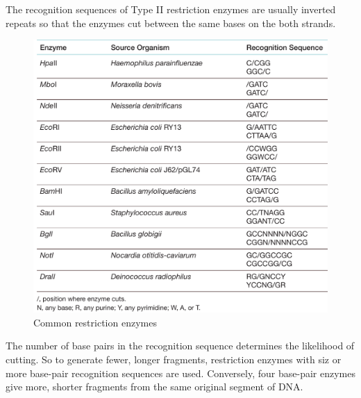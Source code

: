 \documentclass[nofonts,]{tufte-handout}
\begin{document}
The recognition sequences of Type II restriction enzymes are usually
inverted repeats so that the enzymes cut between the same bases on the
both strands.

\begin{figure}
\includegraphics[width=0.9\linewidth]{./images/restriction_enzymes_ex} \caption[Common restriction enzymes]{Common restriction enzymes}\label{fig:restriction-enzymes-ex}
\end{figure}

The number of base pairs in the recognition sequence determines the
likelihood of cutting. So to generate fewer, longer fragments,
restriction enzymes with siz or more base-pair recognition sequences are
used. Conversely, four base-pair enzymes give more, shorter fragments
from the same original segment of DNA.
\end{document}
